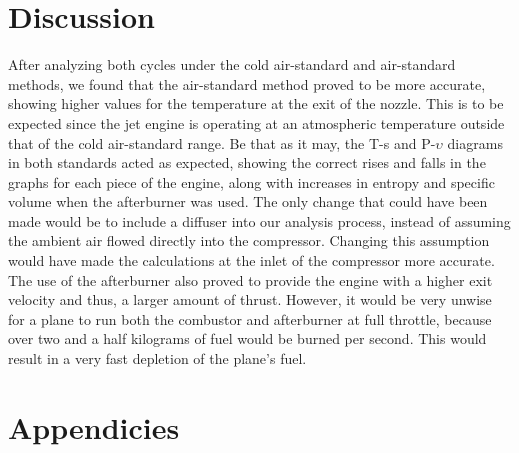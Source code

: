 \documentclass[11pt]{article} %
\begin{document}

\pagebreak
\section{Discussion}
After analyzing both cycles under the cold air-standard and air-standard methods, we found that the air-standard method proved to be more accurate, showing higher values for the temperature at the exit of the nozzle. This is to be expected since the jet engine is operating at an atmospheric temperature outside that of the cold air-standard range. Be that as it may, the T-s and P-$\upsilon$ diagrams in both standards acted as expected, showing the correct rises and falls in the graphs for each piece of the engine, along with increases in entropy and specific volume when the afterburner was used. The only change that could have been made would be to include a diffuser into our analysis process, instead of assuming the ambient air flowed directly into the compressor. Changing this assumption would have made the calculations at the inlet of the compressor more accurate. \\

The use of the afterburner also proved to provide the engine with a higher exit velocity and thus, a larger amount of thrust. However, it would be very unwise for a plane to run both the combustor and afterburner at full throttle, because over two and a half kilograms of fuel would be burned per second. This would result in a very fast depletion of the plane’s fuel.


\section{Appendicies}
\end{document}

